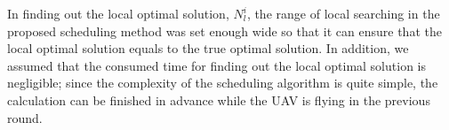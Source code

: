 \documentclass{ieeeaccess}
\begin{document}
In finding out the local optimal solution, $N_{l}^i$, the range of local searching in the proposed scheduling method was set enough wide so that it can ensure that the local optimal solution equals to the true optimal solution.
%
In addition, we assumed that the consumed time for finding out the local optimal solution is negligible; since the complexity of the scheduling algorithm is quite simple, the calculation can be finished in advance while the UAV is flying in the previous round.




\ifCLASSOPTIONcaptionsoff
  \newpage
\fi


\end{document}

